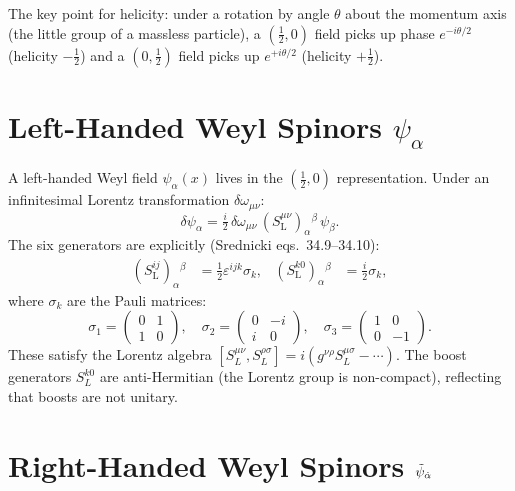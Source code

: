 The key point for helicity: under a rotation by angle $\theta$ about the
momentum axis (the little group of a massless particle), a
$(\tfrac{1}{2},0)$ field picks up phase $e^{-i\theta/2}$ (helicity $-\tfrac{1}{2}$)
and a $(0,\tfrac{1}{2})$ field picks up $e^{+i\theta/2}$ (helicity $+\tfrac{1}{2}$).

\section{Left-Handed Weyl Spinors \texorpdfstring{$\psi_\alpha$}{psi\_alpha}}

A left-handed Weyl field $\psi_\alpha(x)$ lives in the $(\tfrac{1}{2},0)$
representation.  Under an infinitesimal Lorentz transformation
$\delta\omega_{\mu\nu}$:
\begin{equation}
  \delta\psi_\alpha = \tfrac{i}{2}\,\delta\omega_{\mu\nu}\,
    (S^{\mu\nu}_{\mathrm{L}})_\alpha{}^\beta\,\psi_\beta.
\end{equation}
The six generators are explicitly (Srednicki eqs.~34.9--34.10):
\begin{align}
  (S^{ij}_{\mathrm{L}})_\alpha{}^\beta &= \tfrac{1}{2}\varepsilon^{ijk}\sigma_k, &
  (S^{k0}_{\mathrm{L}})_\alpha{}^\beta &= \tfrac{i}{2}\sigma_k,
\end{align}
where $\sigma_k$ are the Pauli matrices:
\begin{equation}
  \sigma_1 = \begin{pmatrix}0&1\\1&0\end{pmatrix},\quad
  \sigma_2 = \begin{pmatrix}0&-i\\i&0\end{pmatrix},\quad
  \sigma_3 = \begin{pmatrix}1&0\\0&-1\end{pmatrix}.
\end{equation}
These satisfy the Lorentz algebra $[S^{\mu\nu}_L, S^{\rho\sigma}_L]
= i(g^{\nu\rho}S^{\mu\sigma}_L - \cdots)$.  The boost generators
$S^{k0}_L$ are anti-Hermitian (the Lorentz group is non-compact),
reflecting that boosts are not unitary.

\section{Right-Handed Weyl Spinors \texorpdfstring{$\tilde\psi_{\dot{\alpha}}$}{psi-tilde}}

